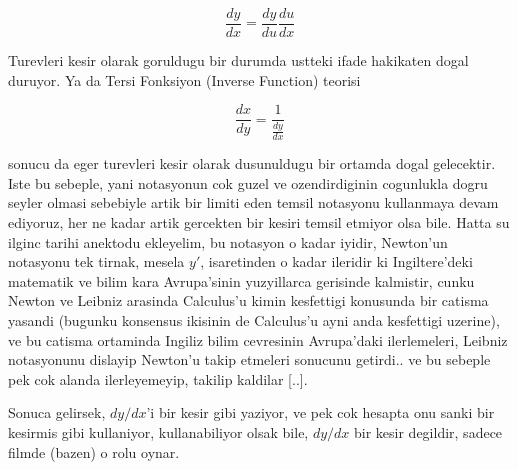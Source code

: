 \documentclass[12pt,fleqn]{article}
\begin{document}
\[ \frac{dy}{dx} = \frac{dy}{du}\frac{du}{dx} \]

Turevleri kesir olarak goruldugu bir durumda ustteki ifade hakikaten dogal
duruyor. Ya da Tersi Fonksiyon (Inverse Function) teorisi

\[ \frac{dx}{dy} = \frac{1}{\frac{dy}{dx}} \]

sonucu da eger turevleri kesir olarak dusunuldugu bir ortamda dogal
gelecektir. Iste bu sebeple, yani notasyonun cok guzel ve ozendirdiginin
cogunlukla dogru seyler olmasi sebebiyle artik bir limiti eden temsil
notasyonu kullanmaya devam ediyoruz, her ne kadar artik gercekten bir
kesiri temsil etmiyor olsa bile. Hatta su ilginc tarihi anektodu ekleyelim,
bu notasyon o kadar iyidir, Newton'un notasyonu tek tirnak, mesela $y'$,
isaretinden o kadar ileridir ki Ingiltere'deki matematik ve bilim kara
Avrupa'sinin yuzyillarca gerisinde kalmistir, cunku Newton ve Leibniz
arasinda Calculus'u kimin kesfettigi konusunda bir catisma yasandi (bugunku
konsensus ikisinin de Calculus'u ayni anda kesfettigi uzerine), ve bu
catisma ortaminda Ingiliz bilim cevresinin Avrupa'daki ilerlemeleri,
Leibniz notasyonunu dislayip Newton'u takip etmeleri sonucunu getirdi.. ve
bu sebeple pek cok alanda ilerleyemeyip, takilip kaldilar [..]. 

Sonuca gelirsek, $dy/dx$'i bir kesir gibi yaziyor, ve pek cok hesapta onu
sanki bir kesirmis gibi kullaniyor, kullanabiliyor olsak bile, $dy/dx$ bir
kesir degildir, sadece filmde (bazen) o rolu oynar. 
\end{document}
